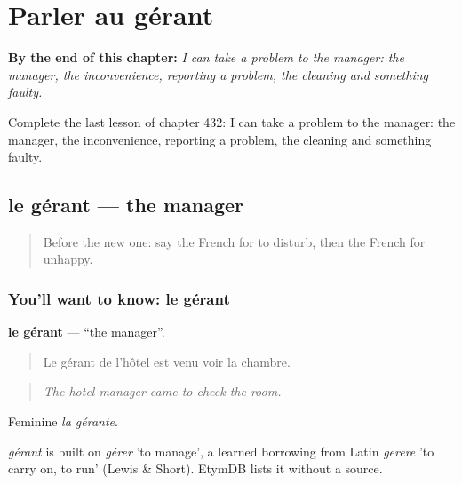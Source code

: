 
\chapter{Parler au gérant}
\label{ch:fr-parler-au-gerant}

\begin{chapteropening}
\textbf{By the end of this chapter:} \emph{I can take a problem to the manager: the manager, the inconvenience, reporting a problem, the cleaning and something faulty.}

Complete the last lesson of chapter 432: I can take a problem to the manager: the manager, the inconvenience, reporting a problem, the cleaning and something faulty.
\end{chapteropening}

\section[le gérant]{le gérant — the manager}

\label{lesson:FR-C432-gerant}



\begin{quote}
Before the new one: say the French for to disturb, then the French for unhappy.
\end{quote}

\subsection*{You'll want to know: le gérant}
\textbf{le gérant} — \textquotedblleft{}the manager\textquotedblright{}.

\begin{quote}
Le gérant de l'hôtel est venu voir la chambre.
\end{quote}

\begin{quote}
\emph{The hotel manager came to check the room.}
\end{quote}

Feminine \emph{la gérante}.

\begin{cousinweb}
\emph{gérant} is built on \emph{gérer} 'to manage', a learned borrowing from Latin \emph{gerere} 'to carry on, to run' (Lewis \& Short). EtymDB lists it without a source.
\end{cousinweb}

